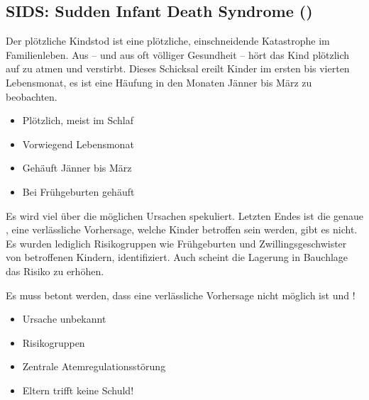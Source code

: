  
 
\subsection{SIDS: Sudden Infant Death Syndrome ()}
\label{topic:sids}

\TextSlide{\TxBeschreibung}
{%
Der plötzliche Kindstod  ist eine plötzliche, einschneidende
Katastrophe im Familienleben. Aus 
-- und aus oft völliger Gesundheit -- hört das Kind
plötzlich auf zu atmen und verstirbt.
Dieses Schicksal ereilt Kinder im ersten bis vierten
Lebensmonat, es ist eine Häufung in den Monaten Jänner bis
März zu beobachten.

}{
\begin{itemize}
    \item Plötzlich, meist im Schlaf
    \item Vorwiegend  Lebensmonat
    \item Gehäuft Jänner bis März
    \item Bei Frühgeburten gehäuft
\end{itemize}
}{}{}{}

{%
Es wird viel über die möglichen Ursachen spekuliert.  Letzten Endes ist
die genaue , eine verlässliche
Vorhersage, welche Kinder betroffen sein werden, gibt es
nicht. Es wurden lediglich Risikogruppen wie Frühgeburten
und Zwillingsgeschwister von betroffenen Kindern,
identifiziert. Auch scheint die Lagerung in Bauchlage das
Risiko zu erhöhen.

Es muss betont werden, dass eine verlässliche Vorhersage
nicht möglich ist und !

}{
\begin{itemize}
    \item Ursache unbekannt
    \item Risikogruppen
    \item Zentrale Atemregulationsstörung 
    \item Eltern trifft keine Schuld!
\end{itemize}
}{}{}{}




